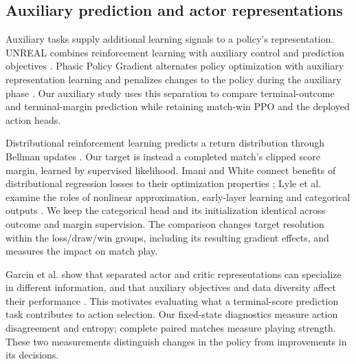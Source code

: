 \subsection{Auxiliary prediction and actor representations}
Auxiliary tasks supply additional learning signals to a policy's representation.
UNREAL combines reinforcement learning with auxiliary control and prediction
objectives \cite{jaderberg2016auxiliary}. Phasic Policy Gradient alternates policy
optimization with auxiliary representation learning and penalizes changes to the
policy during the auxiliary phase \cite{cobbe2021phasic}. Our auxiliary study
uses this separation to compare terminal-outcome and terminal-margin prediction
while retaining match-win PPO and the deployed action heads.

Distributional reinforcement learning predicts a return distribution through
Bellman updates \cite{bellemare2017distributional}. Our target is instead a
completed match's clipped score margin, learned by supervised likelihood.
Imani and White connect benefits of distributional regression losses to their
optimization properties \cite{imani2018distributional}; Lyle et al. examine the
roles of nonlinear approximation, early-layer learning and categorical outputs
\cite{lyle2019comparative}. We keep the categorical head and its initialization
identical across outcome and margin supervision. The comparison changes target
resolution within the loss/draw/win groups, including its resulting gradient
effects, and measures the impact on match play.

Garcin et al. show that separated actor and critic representations can specialize
in different information, and that auxiliary objectives and data diversity
affect their performance \cite{garcin2025interplay}. This motivates evaluating
what a terminal-score prediction task contributes to action selection. Our
fixed-state diagnostics measure action disagreement and entropy; complete
paired matches measure playing strength. These two measurements distinguish
changes in the policy from improvements in its decisions.
